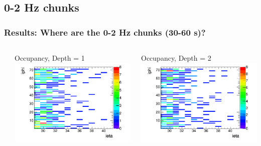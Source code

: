 \documentclass[bigger]{beamer}
\begin{document}
\subsection{0-2 Hz chunks}
\label{sec-3-2}
\begin{frame}
\frametitle{Results: Where are the 0-2 Hz chunks (30-60 s)?}
\label{sec-3-2-1}
\begin{columns} %
\label{sec-3-2-1-1}
\begin{column}{0.55\textwidth}
\label{sec-3-2-1-1-1}

\centering
Occupancy, Depth = 1
\includegraphics[width=\textwidth]{fig/occupancy_frequencyUnder4_time30to60_signifOver10_depth1_hist.png}
\end{column}
\begin{column}{0.55\textwidth}
\label{sec-3-2-1-1-2}

\centering
Occupancy, Depth = 2
\includegraphics[width=\textwidth]{fig/occupancy_frequencyUnder4_time30to60_signifOver10_depth2_hist.png}
\end{column}
\end{columns}
\begin{itemize}


\end{itemize}
\end{frame}
\end{document}
